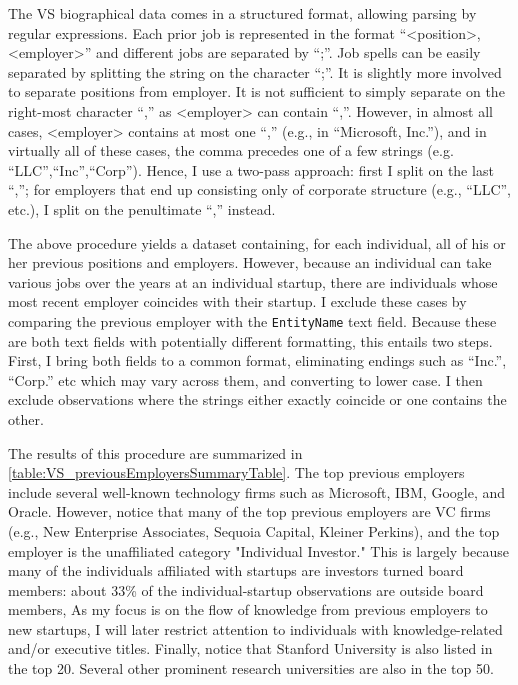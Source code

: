 \documentclass[11pt,english]{article}
\theoremstyle{remark}
\begin{document}
The VS biographical data comes in a structured format, allowing parsing by regular expressions. Each prior job is represented in the format ``<position>, <employer>'' and different jobs are separated by ``;''. Job spells can be easily separated by splitting the string on the character ``;''. It is slightly more involved to separate positions from employer. It is not sufficient to simply separate on the right-most character ``,'' as <employer> can contain ``,''. However, in almost all cases, <employer> contains at most one ``,'' (e.g., in ``Microsoft, Inc.''), and in virtually all of these cases, the comma precedes one of a few strings (e.g. ``LLC'',``Inc'',``Corp''). Hence, I use a two-pass approach: first I split on the last ``,''; for employers that end up consisting only of corporate structure (e.g., ``LLC'', etc.), I split on the penultimate ``,'' instead. 

The above procedure yields a dataset containing, for each individual, all of his or her previous positions and employers. However, because an individual can take various jobs over the years at an individual startup, there are individuals whose most recent employer coincides with their startup. I exclude these cases by comparing the previous employer with the \texttt{EntityName} text field. Because these are both text fields with potentially different formatting, this entails two steps. First, I bring both fields to a common format, eliminating endings such as ``Inc.'', ``Corp.'' etc which may vary across them, and converting to lower case. I then exclude observations where the strings either exactly coincide or one contains the other. 

The results of this procedure are summarized in \autoref{table:VS_previousEmployersSummaryTable}. The top previous employers include several well-known technology firms such as Microsoft, IBM, Google, and Oracle. However, notice that many of the top previous employers are VC firms (e.g., New Enterprise Associates, Sequoia Capital, Kleiner Perkins), and the top employer is the unaffiliated category "Individual Investor." This is largely because many of the individuals affiliated with startups are investors turned board members: about 33\% of the individual-startup observations are outside board members, As my focus is on the flow of knowledge from previous employers to new startups, I will later restrict attention to individuals with knowledge-related and/or executive titles. Finally, notice that Stanford University is also listed in the top 20. Several other prominent research universities are also in the top 50. 
\end{document}
